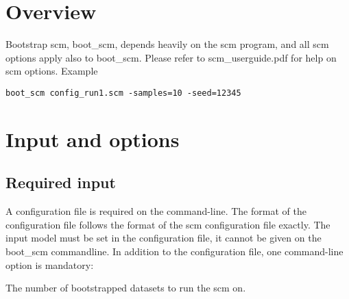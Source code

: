 



\maketitle


\section{Overview}

Bootstrap scm, boot\_scm, depends heavily on the scm program, and all scm options apply also to boot\_scm. Please refer to scm\_userguide.pdf for help on scm options.
Example
\begin{verbatim}
boot_scm config_run1.scm -samples=10 -seed=12345
\end{verbatim}

\section{Input and options}
\subsection{Required input}
A configuration file is required on the command-line. The format of the configuration file follows the format of the scm configuration file exactly. The input model must be set in the configuration file, it cannot be given on the boot\_scm commandline. In addition to the configuration file, one command-line option is mandatory:
\begin{optionlist}
The number of bootstrapped datasets to run the scm on. 
\nextopt
\end{optionlist}

